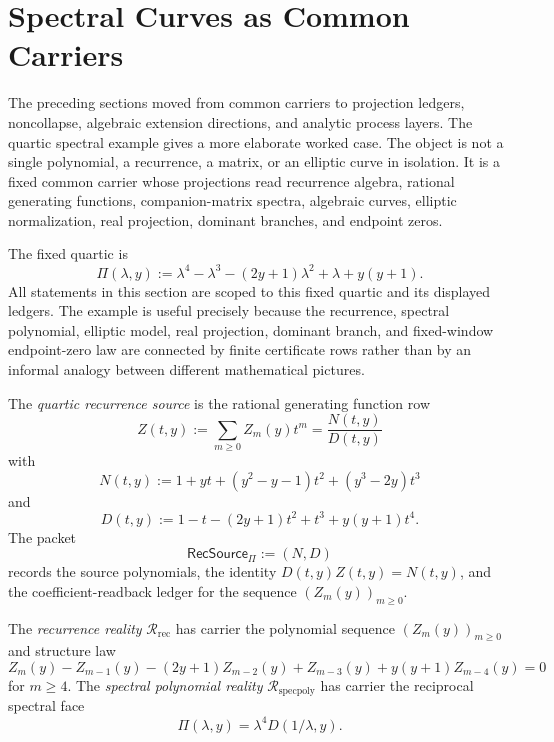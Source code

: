 \section{Spectral Curves as Common Carriers}
\label{sec:unified-reality-quartic-spectral-common-carrier}

The preceding sections moved from common carriers to projection
ledgers, noncollapse, algebraic extension directions, and analytic
process layers. The quartic spectral example gives a more elaborate
worked case. The object is not a single polynomial, a recurrence, a
matrix, or an elliptic curve in isolation. It is a fixed common carrier
whose projections read recurrence algebra, rational generating
functions, companion-matrix spectra, algebraic curves, elliptic
normalization, real projection, dominant branches, and endpoint zeros.

The fixed quartic is
$$
\Pi(\lambda,y)
:=
\lambda^4-\lambda^3-(2y+1)\lambda^2+\lambda+y(y+1).
$$
All statements in this section are scoped to this fixed quartic and its
displayed ledgers. The example is useful precisely because the
recurrence, spectral polynomial, elliptic model, real projection,
dominant branch, and fixed-window endpoint-zero law are connected by
finite certificate rows rather than by an informal analogy between
different mathematical pictures.

\begin{definition}
\label{def:unified-reality-quartic-recurrence-source}
The \emph{quartic recurrence source} is the rational generating
function row
$$
Z(t,y)
:=
\sum_{m\ge0} Z_m(y)t^m
=
\frac{N(t,y)}{D(t,y)}
$$
with
$$
N(t,y)
:=
1+yt+(y^2-y-1)t^2+(y^3-2y)t^3
$$
and
$$
D(t,y)
:=
1-t-(2y+1)t^2+t^3+y(y+1)t^4.
$$
The packet
$$
\mathsf{RecSource}_{\Pi}:=(N,D)
$$
records the source polynomials, the identity $D(t,y)Z(t,y)=N(t,y)$,
and the coefficient-readback ledger for the sequence
$(Z_m(y))_{m\ge0}$.
\end{definition}

\begin{definition}
\label{def:unified-reality-quartic-recurrence-spectral-realities}
The \emph{recurrence reality} $\mathcal R_{\mathrm{rec}}$ has carrier
the polynomial sequence $(Z_m(y))_{m\ge0}$ and structure law
$$
Z_m(y)-Z_{m-1}(y)-(2y+1)Z_{m-2}(y)+Z_{m-3}(y)+y(y+1)Z_{m-4}(y)=0
$$
for $m\ge4$. The \emph{spectral polynomial reality}
$\mathcal R_{\mathrm{specpoly}}$ has carrier the reciprocal spectral
face
$$
\Pi(\lambda,y)=\lambda^4D(1/\lambda,y).
$$
\end{definition}

